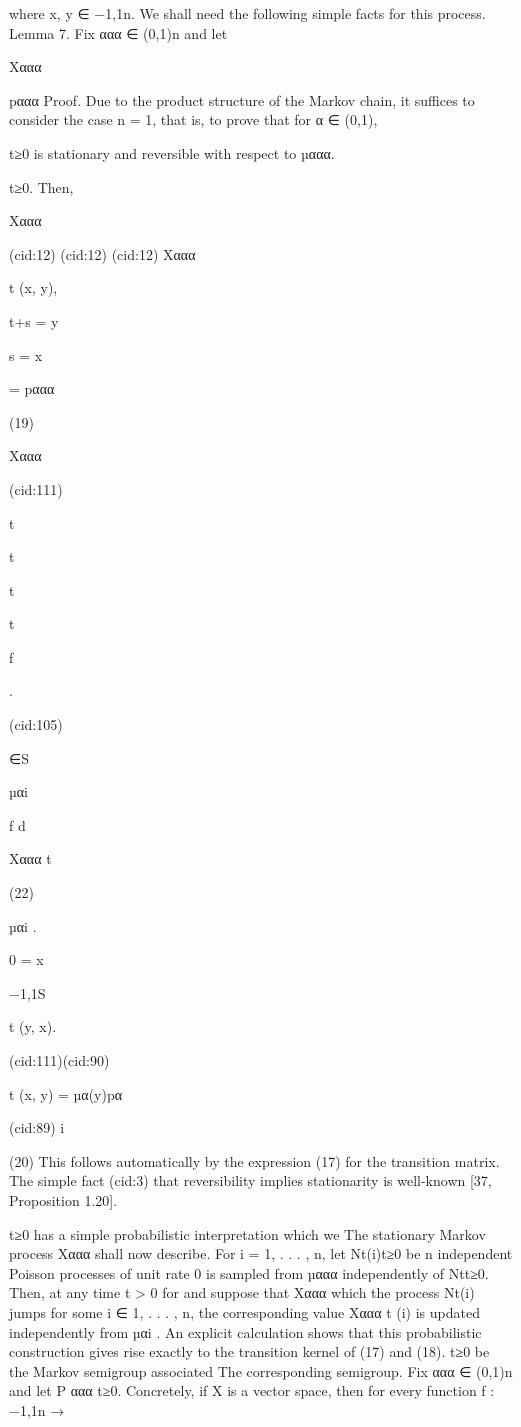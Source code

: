 where x, y ∈ {−1,1}n. We shall need the following simple facts for this process.
Lemma 7. Fix ααα ∈ (0,1)n and let {Xααα
{pααα
Proof. Due to the product structure of the Markov chain, it suﬃces to consider the case n = 1,
that is, to prove that for α ∈ (0,1),

}t≥0 is stationary and reversible with respect to µααα.

}t≥0. Then, {Xααα

(cid:12)
(cid:12)
(cid:12) Xααα

t (x, y),

t+s = y

s = x

= pααα

(19)

Xααα

(cid:111)

t

t

t

t

f

.

(cid:105)

∈S

µαi

f d

Xααα
t

(22)

µαi .

0 = x

{−1,1}S

t (y, x).

(cid:111)(cid:90)

t (x, y) = µα(y)pα

(cid:89) i

(20)
This follows automatically by the expression (17) for the transition matrix. The simple fact
(cid:3)
that reversibility implies stationarity is well-known [37, Proposition 1.20].
}t≥0 has a simple probabilistic interpretation which we
The stationary Markov process {Xααα
shall now describe. For i = 1, . . . , n, let {Nt(i)}t≥0 be n independent Poisson processes of unit rate
0 is sampled from µααα independently of {Nt}t≥0. Then, at any time t > 0 for
and suppose that Xααα
which the process Nt(i) jumps for some i ∈ {1, . . . , n}, the corresponding value Xααα
t (i) is updated
independently from µαi . An explicit calculation shows that this probabilistic construction
gives rise exactly to the transition kernel of (17) and (18).
}t≥0 be the Markov semigroup associated
The corresponding semigroup. Fix ααα ∈ (0,1)n and let {P ααα
}t≥0. Concretely, if X is a vector space, then for every function f : {−1,1}n →
